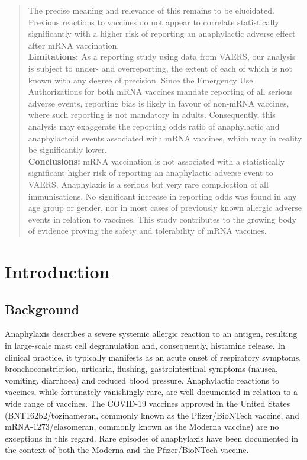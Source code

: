 \documentclass{article}
\begin{document}
\begin{abstract}
        The precise meaning and relevance of this remains to be elucidated.
        Previous reactions to vaccines do not appear to correlate statistically significantly with a higher risk of reporting an anaphylactic adverse effect after mRNA vaccination. \\
    \textbf{Limitations:}
        As a reporting study using data from VAERS, our analysis is subject to under- and overreporting, the extent of each of which is not known with any degree of precision.
        Since the Emergency Use Authorizations for both mRNA vaccines mandate reporting of all serious adverse events, reporting bias is likely in favour of non-mRNA vaccines, where such reporting is not mandatory in adults.
        Consequently, this analysis may exaggerate the reporting odds ratio of anaphylactic and anaphylactoid events associated with mRNA vaccines, which may in reality be significantly lower. \\
    \textbf{Conclusions:}
        mRNA vaccination is not associated with a statistically significant higher risk of reporting an anaphylactic adverse event to VAERS.
        Anaphylaxis is a serious but very rare complication of all immunisations.
        No significant increase in reporting odds was found in any age group or gender, nor in most cases of previously known allergic adverse events in relation to vaccines.
        This study contributes to the growing body of evidence proving the safety and tolerability of mRNA vaccines.
\end{abstract}

\section{Introduction}

\subsection{Background}

Anaphylaxis describes a severe systemic allergic reaction to an antigen, resulting in large-scale mast cell degranulation and, consequently, histamine release.\cite{metcalfe2009mechanisms}
In clinical practice, it typically manifests as an acute onset of respiratory symptoms, bronchoconstriction, urticaria, flushing, gastrointestinal symptoms (nausea, vomiting, diarrhoea) and reduced blood pressure.\cite{lee2011anaphylaxis}
Anaphylactic reactions to vaccines, while fortunately vanishingly rare, are well-documented in relation to a wide range of vaccines.\cite{su2019anaphylaxis,kelso1999anaphylaxis,kelso1993anaphylaxis,nagao2016highly}
The COVID-19 vaccines approved in the United States (BNT162b2/tozinameran, commonly known as the Pfizer/BioNTech vaccine, and mRNA-1273/elasomeran, commonly known as the Moderna vaccine) are no exceptions in this regard.
Rare episodes of anaphylaxis have been documented in the context of both the Moderna\cite{covid2021allergicmoderna} and the Pfizer/BioNTech vaccine.\cite{shimabukuro2021allergic}
\end{document}
